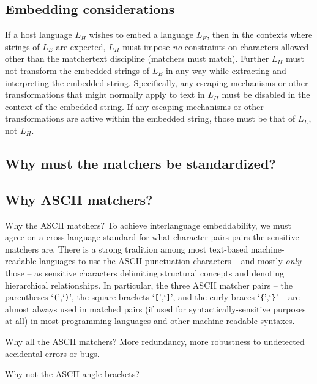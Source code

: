 \subsection{Embedding considerations}

If a host language $L_H$ wishes to embed a language $L_E$,
then in the contexts where strings of $L_E$ are expected,
$L_H$ must impose \emph{no} constraints on characters allowed
other than the matchertext discipline (matchers must match).
Further $L_H$ must not transform the embedded strings of $L_E$ in any way
while extracting and interpreting the embedded string.
Specifically, any escaping mechanisms or other transformations
that might normally apply to text in $L_H$
must be disabled in the context of the embedded string.
If any escaping mechanisms or other transformations
are active within the embedded string,
those must be that of $L_E$, not $L_H$.




\subsection{Why must the matchers be standardized?}



\subsection{Why ASCII matchers?}
\label{sec:design:ascii}

Why the ASCII matchers?
To achieve interlanguage embeddability,
we must agree on a cross-language standard for what character pairs
pairs the sensitive matchers are.
There is a strong tradition among most text-based machine-readable languages
to use the ASCII punctuation characters -- and mostly \emph{only} those --
as sensitive characters delimiting structural concepts
and denoting hierarchical relationships.
In particular, the three ASCII matcher pairs --
the parentheses `\verb|(|',`\verb|)|',
the square brackets `\verb|[|',`\verb|]|',
and the curly braces `\verb|{|',`\verb|}|' --
are almost always used in matched pairs
(if used for syntactically-sensitive purposes at all)
in most programming languages and other machine-readable syntaxes.


Why all the ASCII matchers?  More redundancy, more robustness
to undetected accidental errors or bugs.

Why not the ASCII angle brackets?

